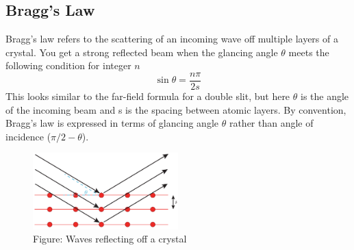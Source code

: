 \documentclass[../main.tex]{subfiles}
\begin{document}
\subsection*{Bragg's Law}
Bragg's law refers to the scattering of an incoming wave off multiple layers of a crystal. You get a strong reflected beam when the glancing angle $\theta$ meets the following condition for integer $n$
\begin{equation*}
    \sin \theta=\frac{n\pi}{2s}
\end{equation*}
This looks similar to the far-field formula for a double slit, but here $\theta$ is the angle of the incoming beam and s is the spacing between atomic layers. By convention, Bragg's law is expressed in terms of glancing angle $\theta$ rather than angle of incidence ($\pi/2 - \theta$).
\begin{figure}
    \centering
    \includegraphics[width=0.5\textwidth]{../Rss/Waves/Bragg.png}
    \caption*{Figure: Waves reflecting off a crystal}
\end{figure}
\end{document}
